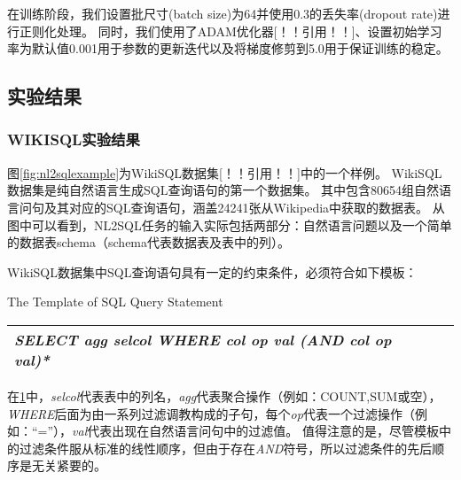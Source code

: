 在训练阶段，我们设置批尺寸(batch size)为64并使用0.3的丢失率(dropout rate)进行正则化处理。
同时，我们使用了ADAM优化器[！！引用！！]、设置初始学习率为默认值0.001用于参数的更新迭代以及将梯度修剪到5.0用于保证训练的稳定。


\subsection{实验结果}
\subsubsection{WIKISQL实验结果}

图\ref{fig:nl2sqlexample}为WikiSQL数据集[！！引用！！]中的一个样例。
WikiSQL数据集是纯自然语言生成SQL查询语句的第一个数据集。
其中包含80654组自然语言问句及其对应的SQL查询语句，涵盖24241张从Wikipedia中获取的数据表。
从图中可以看到，NL2SQL任务的输入实际包括两部分：自然语言问题以及一个简单的数据表schema（schema代表数据表及表中的列）。

WikiSQL数据集中SQL查询语句具有一定的约束条件，必须符合如下模板：

\begin{table}[!hpb]
    \centering
      {The Template of SQL Query Statement}
    \label{nli:sqlmb}
    \begin{tabular}{@{}llr@{}} \toprule
    \emph{SELECT   agg   selcol   WHERE   col   op   val   (AND   col   op   val)*}\\\bottomrule
  
    \end{tabular}
  \end{table}

  在\ref{nli:sqlmb}中，\emph{selcol}代表表中的列名，\emph{agg}代表聚合操作（例如：COUNT,SUM或空），
  \emph{WHERE}后面为由一系列过滤调教构成的子句，每个\emph{op}代表一个过滤操作（例如：“=”），\emph{val}代表出现在自然语言问句中的过滤值。
  值得注意的是，尽管模板中的过滤条件服从标准的线性顺序，但由于存在\emph{AND}符号，所以过滤条件的先后顺序是无关紧要的。

